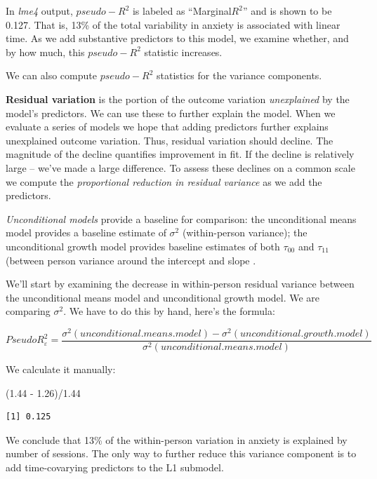 \documentclass[
  english,
]{book}
\newenvironment{Shaded}{\begin{snugshade}}{\end{snugshade}}
\newcommand{\FloatTok}[1]{\textcolor[rgb]{0.00,0.00,0.81}{#1}}
\newcommand{\NormalTok}[1]{#1}
\newcommand{\SpecialCharTok}[1]{\textcolor[rgb]{0.00,0.00,0.00}{#1}}
\begin{document}
In \emph{lme4} output, \(pseudo-R^2\) is labeled as ``Marginal\(R^2\)'' and is shown to be 0.127. That is, 13\% of the total variability in anxiety is associated with linear time. As we add substantive predictors to this model, we examine whether, and by how much, this \(pseudo-R^2\) statistic increases.

We can also compute \(pseudo-R^2\) statistics for the variance components.

\textbf{Residual variation} is the portion of the outcome variation \emph{unexplained} by the model's predictors. We can use these to further explain the model. When we evaluate a series of models we hope that adding predictors further explains unexplained outcome variation. Thus, residual variation should decline. The magnitude of the decline quantifies improvement in fit. If the decline is relatively large -- we've made a large difference. To assess these declines on a common scale we compute the \emph{proportional reduction in residual variance} as we add the predictors.

\emph{Unconditional models} provide a baseline for comparison: the unconditional means model provides a baseline estimate of \(\sigma ^{2}\) (within-person variance); the unconditional growth model provides baseline estimates of both \(\tau _{00}\) and \(\tau _{11}\) (between person variance around the intercept and slope .

We'll start by examining the decrease in within-person residual variance between the unconditional means model and unconditional growth model. We are comparing \(\sigma ^{2}\). We have to do this by hand, here's the formula:

\[Pseudo R_{\varepsilon }^{2} = \frac{\sigma^{2}(unconditional. means. model) - \sigma^{2}(unconditional. growth. model)}{\sigma ^{2}(unconditional. means. model)}\]

We calculate it manually:

\begin{Shaded}
\begin{Highlighting}[]
\NormalTok{(}\FloatTok{1.44} \SpecialCharTok{{-}} \FloatTok{1.26}\NormalTok{)}\SpecialCharTok{/}\FloatTok{1.44}
\end{Highlighting}
\end{Shaded}

\begin{verbatim}
[1] 0.125
\end{verbatim}

We conclude that 13\% of the within-person variation in anxiety is explained by number of sessions. The only way to further reduce this variance component is to add time-covarying predictors to the L1 submodel.
\end{document}
